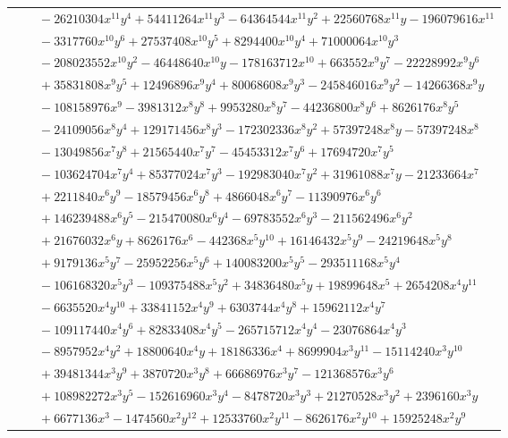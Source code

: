 \documentclass[11pt]{article}
\begin{document}
\begin{longtable}{@{}ll@{}}
 & $\quad -26210304x^{11}y^{4}+54411264x^{11}y^{3}-64364544x^{11}y^{2}+22560768x^{11}y-196079616x^{11}$\\
 & $\quad -3317760x^{10}y^{6}+27537408x^{10}y^{5}+8294400x^{10}y^{4}+71000064x^{10}y^{3}$\\
 & $\quad -208023552x^{10}y^{2}-46448640x^{10}y-178163712x^{10}+663552x^{9}y^{7}-22228992x^{9}y^{6}$\\
 & $\quad +35831808x^{9}y^{5}+12496896x^{9}y^{4}+80068608x^{9}y^{3}-245846016x^{9}y^{2}-14266368x^{9}y$\\
 & $\quad -108158976x^{9}-3981312x^{8}y^{8}+9953280x^{8}y^{7}-44236800x^{8}y^{6}+8626176x^{8}y^{5}$\\
 & $\quad -24109056x^{8}y^{4}+129171456x^{8}y^{3}-172302336x^{8}y^{2}+57397248x^{8}y-57397248x^{8}$\\
 & $\quad -13049856x^{7}y^{8}+21565440x^{7}y^{7}-45453312x^{7}y^{6}+17694720x^{7}y^{5}$\\
 & $\quad -103624704x^{7}y^{4}+85377024x^{7}y^{3}-192983040x^{7}y^{2}+31961088x^{7}y-21233664x^{7}$\\
 & $\quad +2211840x^{6}y^{9}-18579456x^{6}y^{8}+4866048x^{6}y^{7}-11390976x^{6}y^{6}$\\
 & $\quad +146239488x^{6}y^{5}-215470080x^{6}y^{4}-69783552x^{6}y^{3}-211562496x^{6}y^{2}$\\
 & $\quad +21676032x^{6}y+8626176x^{6}-442368x^{5}y^{10}+16146432x^{5}y^{9}-24219648x^{5}y^{8}$\\
 & $\quad +9179136x^{5}y^{7}-25952256x^{5}y^{6}+140083200x^{5}y^{5}-293511168x^{5}y^{4}$\\
 & $\quad -106168320x^{5}y^{3}-109375488x^{5}y^{2}+34836480x^{5}y+19899648x^{5}+2654208x^{4}y^{11}$\\
 & $\quad -6635520x^{4}y^{10}+33841152x^{4}y^{9}+6303744x^{4}y^{8}+15962112x^{4}y^{7}$\\
 & $\quad -109117440x^{4}y^{6}+82833408x^{4}y^{5}-265715712x^{4}y^{4}-23076864x^{4}y^{3}$\\
 & $\quad -8957952x^{4}y^{2}+18800640x^{4}y+18186336x^{4}+8699904x^{3}y^{11}-15114240x^{3}y^{10}$\\
 & $\quad +39481344x^{3}y^{9}+3870720x^{3}y^{8}+66686976x^{3}y^{7}-121368576x^{3}y^{6}$\\
 & $\quad +108982272x^{3}y^{5}-152616960x^{3}y^{4}-8478720x^{3}y^{3}+21270528x^{3}y^{2}+2396160x^{3}y$\\
 & $\quad +6677136x^{3}-1474560x^{2}y^{12}+12533760x^{2}y^{11}-8626176x^{2}y^{10}+15925248x^{2}y^{9}$\\

\end{longtable}
\end{document}
